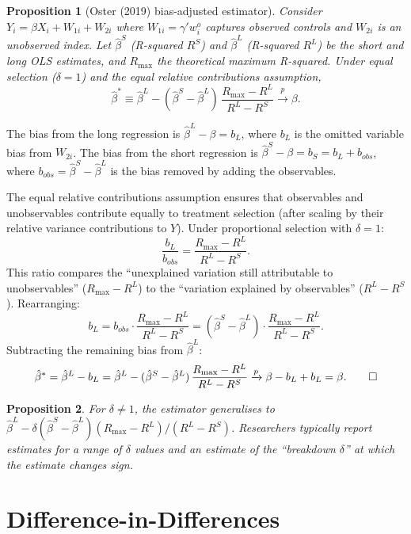 \documentclass[12pt,a4paper]{article}
\theoremstyle{plain}
\newtheorem{propositio}{Proposition}[section]
\theoremstyle{definition}
\renewenvironment{proof}{\pushQED{\qed}\normalfont}{\popQED\par\nobreak}
\begin{document}
\begin{propositio}[Oster (2019) bias-adjusted estimator\label{prop:oster}]
Consider $Y_i = \beta X_i + W_{1i} + W_{2i}$ where $W_{1i}=\gamma'w_i^o$ captures observed controls and $W_{2i}$ is an unobserved index.
Let $\hat\beta^S$ (R-squared $R^S$) and $\hat\beta^L$ (R-squared $R^L$) be the short and long OLS estimates, and $R_{\max}$ the theoretical maximum R-squared.
Under equal selection ($\delta=1$) and the equal relative contributions assumption,
\[
  \hat\beta^* \equiv \hat\beta^L - (\hat\beta^S-\hat\beta^L)\,\frac{R_{\max}-R^L}{R^L-R^S} \xrightarrow{p} \beta.
\]
\end{propositio}

\begin{proof}
The bias from the long regression is $\hat\beta^L - \beta = b_L$, where $b_L$ is the omitted variable bias from $W_{2i}$.  The bias from the short regression is $\hat\beta^S - \beta = b_S = b_L + b_{obs}$, where $b_{obs}=\hat\beta^S-\hat\beta^L$ is the bias removed by adding the observables.

The equal relative contributions assumption ensures that observables and unobservables contribute equally to treatment selection (after scaling by their relative variance contributions to $Y$).  Under proportional selection with $\delta=1$:
\[
  \frac{b_L}{b_{obs}} = \frac{R_{\max}-R^L}{R^L-R^S}.
\]
This ratio compares the ``unexplained variation still attributable to unobservables'' ($R_{\max}-R^L$) to the ``variation explained by observables'' ($R^L-R^S$).  Rearranging:
\[
  b_L = b_{obs}\cdot\frac{R_{\max}-R^L}{R^L-R^S}
    = (\hat\beta^S-\hat\beta^L)\cdot\frac{R_{\max}-R^L}{R^L-R^S}.
\]
Subtracting the remaining bias from $\hat\beta^L$:
\[
  \hat\beta^* = \hat\beta^L - b_L
  = \hat\beta^L - (\hat\beta^S-\hat\beta^L)\,\frac{R_{\max}-R^L}{R^L-R^S}
  \xrightarrow{p} \beta - b_L + b_L = \beta. \qedhere
\]
\end{proof}

\begin{propositio}
  For $\delta\ne 1$, the estimator generalises to $\hat\beta^L - \delta(\hat\beta^S-\hat\beta^L)(R_{\max}-R^L)/(R^L-R^S)$. Researchers typically report estimates for a range of $\delta$ values and an estimate of the ``breakdown $\delta$'' at which the estimate changes sign.
\end{propositio}

\section{Difference-in-Differences}
\end{document}
